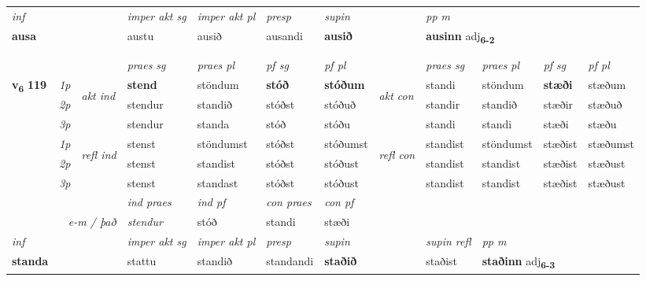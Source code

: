 \begin{longtable}[l]{X>{\footnotesize\itshape}llXXXXlXXXX}
   {\textit{inf}} & &  & \textit{imper akt sg} & \textit{imper akt pl}   & \textit{presp} & \textit{supin}  && \textit{pp m} \\*
  {\textbf{ausa}} & && austu  & ausið   & ausandi &  \textbf{ausið}  && \multicolumn{2}{l}{\textbf{ausinn} adj\textbf{\textsubscript{6-2}}} \\*

\midrule
 & \\*
  & \\
   \midrule
 & &   & \textit{praes sg}  & \textit{praes pl}    & \textit{ pf sg} & \textit{pf pl} & & \textit{praes sg}  & \textit{praes pl}    & \textit{pf sg} & \textit{pf pl }  \\ \cmidrule{4-7} \cmidrule{9-12}
 \multirow{2}{*}{{{\textbf{v{\textsubscript{6}}} \Large{\textbf{119}}}}}  & 1p & \multirow{3}{*}{\begin{turn}{90}\textit{akt ind}\end{turn}} & \textbf{stend} & stöndum & \textbf{stóð} & \textbf{stóðum} & \multirow{3}{*}{\begin{turn}{90}\textit{akt con}\end{turn}} &standi & stöndum & \textbf{stæði} & stæðum\\*
 & 2p &  &  stendur  & standið & stóðst & stóðuð & & standir & standið & stæðir & stæðuð \\*
 & 3p &  & stendur & standa & stóð & stóðu & & standi & standi& stæði & stæðu \\*
\cmidrule{4-7} \cmidrule{9-12}
 & 1p & \multirow{3}{*}{\begin{turn}{90}\textit{refl ind}\end{turn}}  & stenst & stöndumst & stóðst & stóðumst & \multirow{3}{*}{\begin{turn}{90}\textit{refl con}\end{turn}}  &standist & stöndumst & stæðist & stæðumst \\*
 & 2p &  & stenst & standist & stóðst & stóðust & &standist & standist & stæðist & stæðust \\*
 & 3p  & & stenst & standast & stóðst & stóðust & & standist & standist& stæðist & stæðust \\*
\cmidrule{4-7} \cmidrule{9-12}

   && &  \textit{ind praes} & \textit{ind pf} & \textit{con praes} & \textit{con pf} \\*
\multicolumn{3}{r}{\textit{e-m / það}} & stendur & stóð & standi & stæði \\*

\cmidrule{4-7}
   {\textit{inf}} & &  & \textit{imper akt sg} & \textit{imper akt pl}   & \textit{presp} & \textit{supin} && \textit{supin refl} & \textit{pp m} \\*
  {\textbf{standa}} & && stattu  & standið   & standandi &  \textbf{staðið} && staðist & \multicolumn{2}{l}{\textbf{staðinn} adj\textbf{\textsubscript{6-3}}} \\*


\end{longtable}
